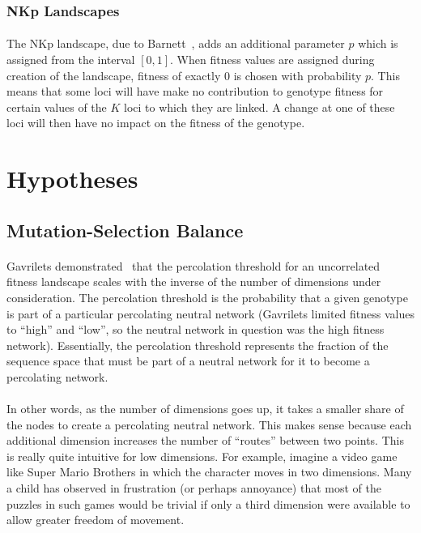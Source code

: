 \documentclass[12pt,letterpaper,titlepage]{article}
\begin{document}
\subsubsection{NKp Landscapes}

\paragraph{}
The NKp landscape, due to Barnett~\cite{Barnett1998}, adds an additional
parameter $p$ which is assigned from the interval $\left[0,1\right]$. When
fitness values are assigned during creation of the landscape, fitness of
exactly 0 is chosen with probability $p$. This means that some loci will have
make no contribution to genotype fitness for certain values of the $K$ loci to
which they are linked. A change at one of these loci will then have no impact
on the fitness of the genotype.

\section{Hypotheses}

\subsection{Mutation-Selection Balance}

\paragraph{}
Gavrilets demonstrated~\cite{Gavrilets1997} that the percolation threshold for
an uncorrelated fitness landscape scales with the inverse of the number of
dimensions under consideration. The percolation threshold is the probability
that a given genotype is part of a particular percolating neutral network
(Gavrilets limited fitness values to ``high'' and ``low'', so the neutral
network in question was the high fitness network). Essentially, the percolation
threshold represents the fraction of the sequence space that must be part of a
neutral network for it to become a percolating network.

\paragraph{}
In other words, as the number of dimensions goes up, it takes a smaller share
of the nodes to create a percolating neutral network. This makes sense because
each additional dimension increases the number of ``routes'' between two
points. This is really quite intuitive for low dimensions. For example, imagine
a video game like Super Mario Brothers in which the character moves in two
dimensions. Many a child has observed in frustration (or perhaps annoyance)
that most of the puzzles in such games would be trivial if only a third
dimension were available to allow greater freedom of movement.
\end{document}

